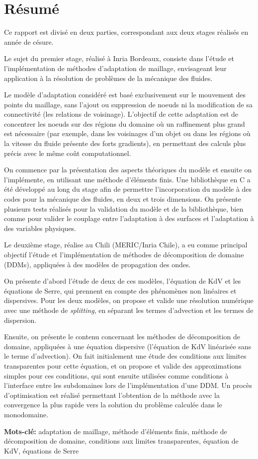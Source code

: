 \section*{Résumé}

\indent Ce rapport est divisé en deux parties, correspondant aux deux stages réalisés en année de césure.

\indent Le sujet du premier stage, réalisé à Inria Bordeaux, consiste dans l'étude et l'implémentation de méthodes d'adaptation de maillage, envisageant leur application à la résolution de problèmes de la mécanique des fluides.

\indent Le modèle d'adaptation considéré est basé exclusivement sur le mouvement des points du maillage, sans l'ajout ou suppression de noeuds ni la modification de sa connectivité (les relations de voisinage). L'objectif de cette adaptation est de concentrer les noeuds sur des régions du domaine où un raffinement plus grand est nécessaire (par exemple, dans les voisinages d'un objet ou dans les régions où la vitesse du fluide présente des forts gradients), en permettant des calculs plus précis avec le même coût computationnel.

\indent On commence par la présentation des aspects théoriques du modèle et ensuite on l'implémente, en utilisant une méthode d'éléments finis. Une bibliothèque en C a été développé au long du stage afin de permettre l'incorporation du modèle à des codes pour la mécanique des fluides, en deux et trois dimensions. On présente plusieurs tests réalisés pour la validation du modèle et de la bibliothèque, bien comme pour valider le couplage entre l'adaptation à des surfaces et l'adaptation à des variables physiques.

\indent Le deuxième stage, réalise au Chili (MERIC/Inria Chile), a eu comme principal objectif l'étude et l'implémentation de méthodes de décomposition de domaine (DDMs), appliquées à des modèles de propagation des ondes.

\indent On présente d'abord l'étude de deux de ces modèles, l'équation de KdV et les équations de Serre, qui prennent en compte des phénomènes non linéaires et dispersives. Pour les deux modèles, on propose et valide une résolution numérique avec une méthode de \emph{splitting}, en séparant les termes d'advection et les termes de dispersion.

\indent Ensuite, on présente le contenu concernant les méthodes de décomposition de domaine, appliquées à une équation dispersive (l'équation de KdV linéarisée sans le terme d'advection). On fait initialement une étude des conditions aux limites transparentes pour cette équation, et on propose et valide des approximations simples pour ces conditions, qui sont ensuite utilisées comme conditions à l'interface entre les subdomaines lors de l'implémentation d'une DDM. Un procès d'optimisation est réalisé permettant l'obtention de la méthode avec la convergence la plus rapide vers la solution du problème calculée dans le monodomaine.

\indent \textbf{Mots-clé:} adaptation de maillage, méthode d'éléments finis, méthode de décomposition de domaine, conditions aux limites transparentes, équation de KdV, équations de Serre
